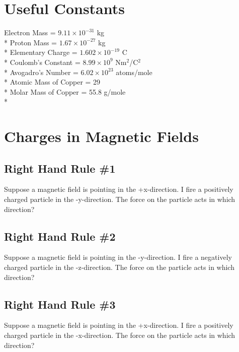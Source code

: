 \documentclass[12pt]{article}
\begin{document}
\maketitle
\tableofcontents
\hspace{30mm}

\section*{Useful Constants}
Electron Mass = $9.11 \times 10^{-31}$ kg \\*
Proton Mass = $1.67 \times 10^{-27}$ kg \\*
Elementary Charge = $1.602 \times 10^{-19}$ C \\*
Coulomb's Constant = $8.99 \times 10^9$ Nm$^2$/C$^2$ \\*
Avogadro's Number = $ 6.02 \times 10^{23}$ atoms/mole \\*
Atomic Mass of Copper = 29 \\*
Molar Mass of Copper = 55.8 g/mole \\*


\pagebreak
\section{Charges in Magnetic Fields}

\subsection{Right Hand Rule \#1}
Suppose a magnetic field is pointing in the +x-direction.  I fire a positively charged particle in the -y-direction.  The force on the particle acts in which direction?

\subsection{Right Hand Rule \#2}
Suppose a magnetic field is pointing in the -y-direction.  I fire a negatively charged particle in the -z-direction.  The force on the particle acts in which direction?

\subsection{Right Hand Rule \#3}
Suppose a magnetic field is pointing in the +x-direction.  I fire a positively charged particle in the -x-direction.  The force on the particle acts in which direction?
\end{document}
